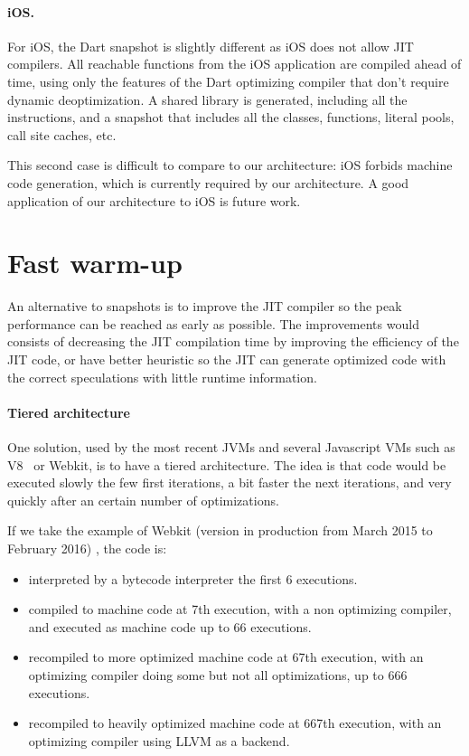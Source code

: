 \documentclass[a4paper,12pt,twoside]{../includes/ThesisStyle}
\begin{document}
\paragraph{iOS.} For iOS, the Dart snapshot is slightly different as iOS does not allow JIT compilers. All reachable functions from the iOS application are compiled ahead of time, using only the features of the Dart optimizing compiler that don't require dynamic deoptimization. A shared library is generated, including all the instructions, and a snapshot that includes all the classes, functions, literal pools, call site caches, etc.

This second case is difficult to compare to our architecture: iOS forbids machine code generation, which is currently required by our architecture. A good application of our architecture to iOS is future work.

\section{Fast warm-up}

An alternative to snapshots is to improve the JIT compiler so the peak performance can be reached as early as possible. The improvements would consists of decreasing the JIT compilation time by improving the efficiency of the JIT code, or have better heuristic so the JIT can generate optimized code with the correct speculations with little runtime information.

\paragraph{Tiered architecture}
One solution, used by the most recent JVMs and several Javascript VMs such as V8~\cite{V8} or Webkit, is to have a tiered architecture. The idea is that code would be executed slowly the few first iterations, a bit faster the next iterations, and very quickly after an certain number of optimizations. 

If we take the example of Webkit (version in production from March 2015 to February 2016) \cite{Webkit15}, the code is:
\begin{itemize}
\item interpreted by a bytecode interpreter the first 6 executions.
\item compiled to machine code at 7th execution, with a non optimizing compiler, and executed as machine code up to 66 executions.
\item recompiled to more optimized machine code at 67th execution, with an optimizing compiler doing some but not all optimizations, up to 666 executions.
\item recompiled to heavily optimized machine code at 667th execution, with an optimizing compiler using LLVM as a backend.
\end{itemize}
\end{document}
